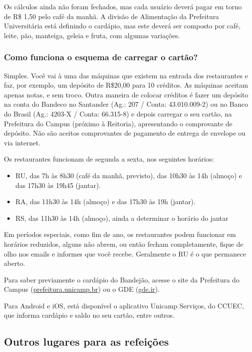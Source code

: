 Os cálculos ainda não foram fechados, mas cada usuário deverá pagar em torno de
R\$ 1,50 pelo café da manhã. A divisão de Alimentação da Prefeitura
Universitária está definindo o cardápio, mas este deverá ser composto por café,
leite, pão, manteiga, geleia e fruta, com algumas variações.

\subsubsection{Como funciona o esquema de carregar o cartão?}

Simples. Você vai à uma das máquinas que existem na entrada dos restaurantes e
faz, por exemplo, um depósito de R\$20,00 para 10 créditos. As máquinas aceitam
apenas notas, e sem troco. Outra maneira de colocar créditos é fazer um depósito
na conta do Bandeco no Santander (Ag.: 207 / Conta: 43.010.009-2) ou no Banco do
Brasil (Ag.: 4203-X / Conta: 66.315-8) e depois carregar o seu cartão, na
Prefeitura do Campus (próximo à Reitoria), apresentando o comprovante de
depósito. Não são aceitos comprovantes de pagamento de entrega de envelope ou
via internet.

Os restaurantes funcionam de segunda a sexta, nos seguintes horários:

\begin{itemize}
\item RU, das 7h às 8h30 (café da manhã, previsto), das 10h30 às 14h (almoço) e
  das 17h30 às 19h45 (jantar).
\item RA, das 11h30 às 14h (almoço) e das 17h30 às 19h (jantar).
\item RS, das 11h30 às 14h (almoço), ainda a determinar o horário do jantar
\end{itemize}

Em períodos especiais, como fim de ano, os restaurantes podem funcionar em
horários reduzidos, alguns não abrem, ou então fecham completamente, fique de
olho nos emails e informes que você recebe. Geralmente o RU é o que permanece
aberto.

Para saber previamente o cardápio do Bandejão, acesse o site da Prefeitura do
Campus (\url{prefeitura.unicamp.br}) ou o GDE (\url{gde.ir}).

Para Android e iOS, está disponível o aplicativo Unicamp Serviços, do CCUEC, que
informa cardápio e saldo no seu cartão, entre outros.

\subsection{Outros lugares para as refeições}

